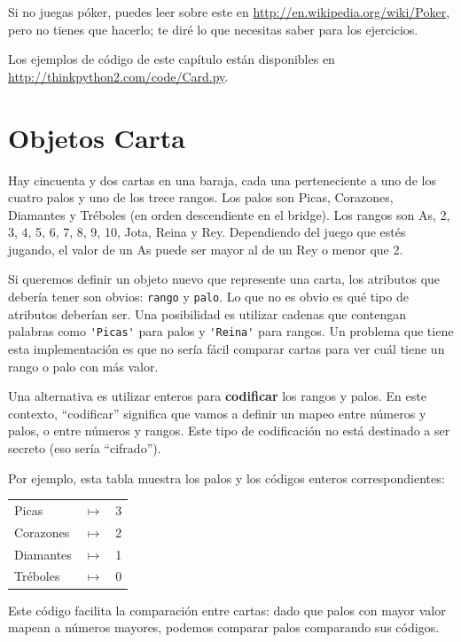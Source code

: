 \documentclass[10pt]{book}
\begin{document}
Si no juegas
póker, puedes leer sobre este en
\url{http://en.wikipedia.org/wiki/Poker}, pero no tienes que hacerlo; 
te diré lo que necesitas saber para los ejercicios.

Los ejemplos de código de
este capítulo están disponibles en
\url{http://thinkpython2.com/code/Card.py}.


\section{Objetos Carta}

Hay cincuenta y dos cartas en una baraja, cada una perteneciente a uno de
los cuatro palos y uno de los trece rangos.  Los palos son Picas, Corazones,
Diamantes y Tréboles (en orden descendiente en el bridge).  Los rangos son
As, 2, 3, 4, 5, 6, 7, 8, 9, 10, Jota, Reina y Rey.  Dependiendo del
juego que estés jugando, el valor de un As puede ser mayor al de un Rey
o menor que 2.

Si queremos definir un objeto nuevo que represente una carta, los
atributos que debería tener son obvios: {\tt rango} y
{\tt palo}.  Lo que no es obvio es qué tipo de atributos
deberían ser.  Una posibilidad es utilizar cadenas que contengan palabras como
\verb"'Picas'" para palos y \verb"'Reina'" para rangos.  Un problema que
tiene esta implementación es que no sería fácil comparar cartas para
ver cuál tiene un rango o palo con más valor.

Una alternativa es utilizar enteros para {\bf codificar} los rangos y palos.
En este contexto, ``codificar'' significa que vamos a definir un mapeo
entre números y palos, o entre números y rangos.  Este
tipo de codificación no está destinado a ser secreto (eso
sería ``cifrado'').

\newcommand{\mymapsto}{$\mapsto$}

Por ejemplo, esta tabla muestra los palos y los códigos enteros
correspondientes:

\begin{tabular}{l c l}
Picas & \mymapsto & 3 \\
Corazones & \mymapsto & 2 \\
Diamantes & \mymapsto & 1 \\
Tréboles & \mymapsto & 0
\end{tabular}

Este código facilita la comparación entre cartas: dado que palos con mayor valor mapean a
números mayores, podemos comparar palos comparando sus códigos.
\end{document}
